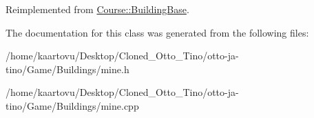 Reimplemented from \hyperlink{class_course_1_1_building_base_ac2cc44e08dc73d05b1617bf71295baaf}{Course\-::\-Building\-Base}.



The documentation for this class was generated from the following files\-:\begin{DoxyCompactItemize}
\item 
/home/kaartovu/\-Desktop/\-Cloned\-\_\-\-Otto\-\_\-\-Tino/otto-\/ja-\/tino/\-Game/\-Buildings/mine.\-h\item 
/home/kaartovu/\-Desktop/\-Cloned\-\_\-\-Otto\-\_\-\-Tino/otto-\/ja-\/tino/\-Game/\-Buildings/mine.\-cpp\end{DoxyCompactItemize}
